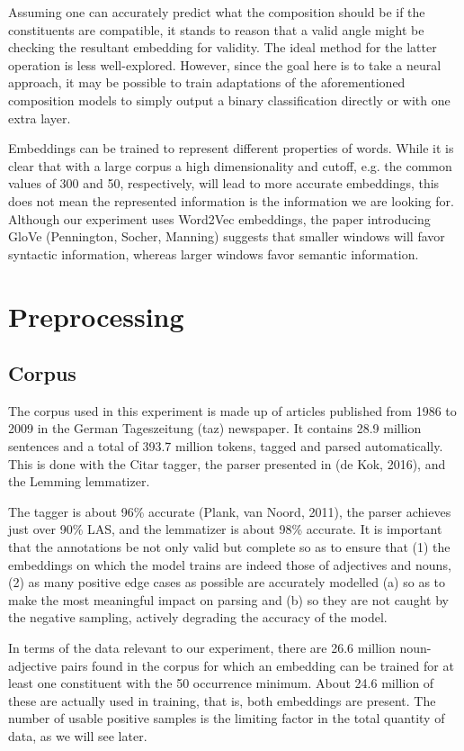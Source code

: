 \documentclass[a4paper, 11pt]{scrartcl}
\begin{document}
Assuming one can accurately predict what the composition should be if the constituents are compatible, it stands to reason that a valid angle might be checking the resultant embedding for validity. The ideal method for the latter operation is less well-explored. However, since the goal here is to take a neural approach, it may be possible to train adaptations of the aforementioned composition models to simply output a binary classification directly or with one extra layer.

Embeddings can be trained to represent different properties of words. While it is clear that with a large corpus a high dimensionality and cutoff, e.g. the common values of 300 and 50, respectively, will lead to more accurate embeddings, this does not mean the represented information is the information we are looking for. Although our experiment uses Word2Vec embeddings, the paper introducing GloVe (Pennington, Socher, Manning) suggests that smaller windows will favor syntactic information, whereas larger windows favor semantic information.


\section{Preprocessing}

\subsection{Corpus}

The corpus used in this experiment is made up of articles published from 1986 to 2009 in the German Tageszeitung (taz) newspaper. It contains 28.9 million sentences and a total of 393.7 million tokens, tagged and parsed automatically. This is done with the Citar tagger, the parser presented in (de Kok, 2016), and the Lemming lemmatizer.

The tagger is about 96\% accurate (Plank, van Noord, 2011), the parser achieves just over 90\% LAS, and the lemmatizer is about 98\% accurate. It is important that the annotations be not only valid but complete so as to ensure that (1) the embeddings on which the model trains are indeed those of adjectives and nouns, (2) as many positive edge cases as possible are accurately modelled (a) so as to make the most meaningful impact on parsing and (b) so they are not caught by the negative sampling, actively degrading the accuracy of the model.

In terms of the data relevant to our experiment, there are 26.6 million noun-adjective pairs found in the corpus for which an embedding can be trained for at least one constituent with the 50 occurrence minimum. About 24.6 million of these are actually used in training, that is, both embeddings are present. The number of usable positive samples is the limiting factor in the total quantity of data, as we will see later.
\end{document}
